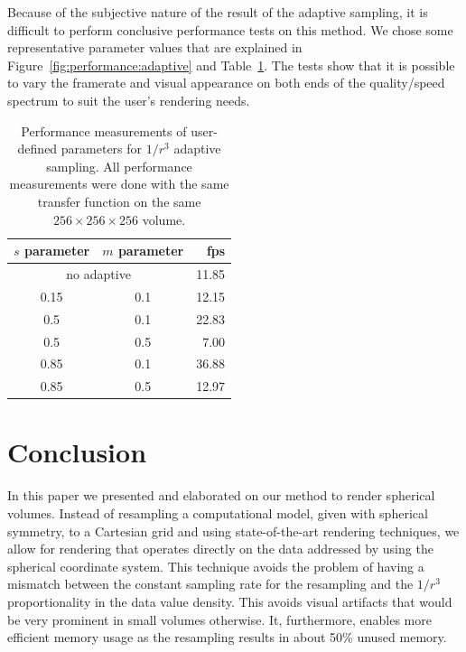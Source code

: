 \documentclass{egpubl}
\begin{document}
Because of the subjective nature of the result of the adaptive sampling, it is difficult to perform conclusive performance tests on this method. We chose some representative parameter values that are explained in Figure~\ref{fig:performance:adaptive} and Table~\ref{tab:performance}. The tests show that it is possible to vary the framerate and visual appearance on both ends of the quality/speed spectrum to suit the user's rendering needs.

\begin{table}[b]
  \caption{Performance measurements of user-defined parameters for $1/r^3$ adaptive sampling. All performance measurements were done with the same transfer function on the same $256 \times 256 \times 256$ volume.}
  \label{tab:performance}
  \begin{center}
    \begin{tabular}{|c|c|r|}
      \hline
      $s$ parameter & $m$ parameter & fps \\
      \hline
      \multicolumn{2}{|c|}{no adaptive} & 11.85 \\
      0.15 & 0.1 & 12.15 \\
      0.5  & 0.1 & 22.83 \\
      0.5  & 0.5 & 7.00 \\
      0.85 & 0.1 & 36.88 \\
      0.85 & 0.5 & 12.97 \\
      \hline
    \end{tabular}
  \end{center}
\end{table}

\section{Conclusion}
\label{sec:conclusion}
In this paper we presented and elaborated on our method to render spherical volumes. Instead of resampling a computational model, given with spherical symmetry, to a Cartesian grid and using state-of-the-art rendering techniques, we allow for rendering that operates directly on the data addressed by using the spherical coordinate system. This technique avoids the problem of having a mismatch between the constant sampling rate for the resampling and the $1/r^3$ proportionality in the data value density. This avoids visual artifacts that would be very prominent in small volumes otherwise. It, furthermore, enables more efficient memory usage as the resampling results in about 50\% unused memory.
\end{document}
